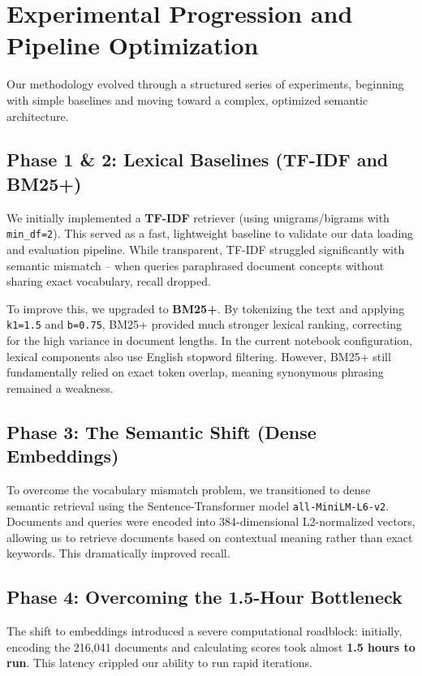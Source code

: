 \documentclass[11pt,a4paper]{article}
\begin{document}
\section{Experimental Progression and Pipeline Optimization}

Our methodology evolved through a structured series of experiments, beginning with simple baselines and moving toward a complex, optimized semantic architecture.

\subsection{Phase 1 \& 2: Lexical Baselines (TF-IDF and BM25+)}
We initially implemented a \textbf{TF-IDF} retriever (using unigrams/bigrams with \texttt{min\_df=2}). This served as a fast, lightweight baseline to validate our data loading and evaluation pipeline. While transparent, TF-IDF struggled significantly with semantic mismatch -- when queries paraphrased document concepts without sharing exact vocabulary, recall dropped.

To improve this, we upgraded to \textbf{BM25+}. By tokenizing the text and applying \texttt{k1=1.5} and \texttt{b=0.75}, BM25+ provided much stronger lexical ranking, correcting for the high variance in document lengths. In the current notebook configuration, lexical components also use English stopword filtering. However, BM25+ still fundamentally relied on exact token overlap, meaning synonymous phrasing remained a weakness.

\subsection{Phase 3: The Semantic Shift (Dense Embeddings)}
To overcome the vocabulary mismatch problem, we transitioned to dense semantic retrieval using the Sentence-Transformer model \texttt{all-MiniLM-L6-v2}. Documents and queries were encoded into 384-dimensional L2-normalized vectors, allowing us to retrieve documents based on contextual meaning rather than exact keywords. This dramatically improved recall.

\subsection{Phase 4: Overcoming the 1.5-Hour Bottleneck}
The shift to embeddings introduced a severe computational roadblock: initially, encoding the 216,041 documents and calculating scores took almost \textbf{1.5 hours to run}. This latency crippled our ability to run rapid iterations.
\end{document}

